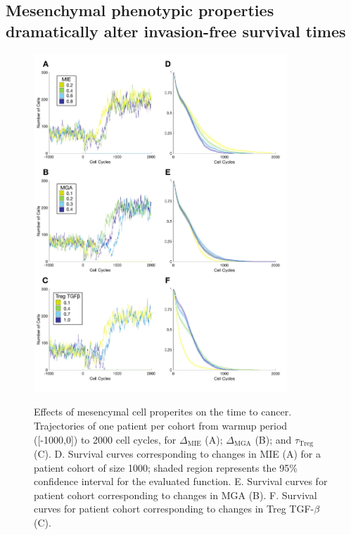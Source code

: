 \documentclass[11pt]{article}
\begin{document}
\subsection{Mesenchymal phenotypic properties dramatically alter invasion-free survival times}\label{MesPars}

\begin{figure}
\center
{\includegraphics[width=0.85\textwidth]{Figure3/Figure3.pdf}}
\caption{Effects of mesencymal cell properites on the time to cancer. Trajectories of one patient per cohort from warmup period ([-1000,0]) to 2000 cell cycles, for $\Delta_\text{MIE}$ (A); $\Delta_\text{MGA}$ (B); and $\tau_\text{Treg}$ (C). 
D. Survival curves corresponding to changes in MIE (A) for a patient cohort of size 1000; shaded region represents the 95\% confidence interval for the evaluated function. 
E. Survival curves for patient cohort corresponding to changes in MGA (B).
F. Survival curves for patient cohort corresponding to changes in Treg TGF-$\beta$ (C). 
}
\label{fig:FirstSurvivalCurves}
\end{figure}
\end{document}
